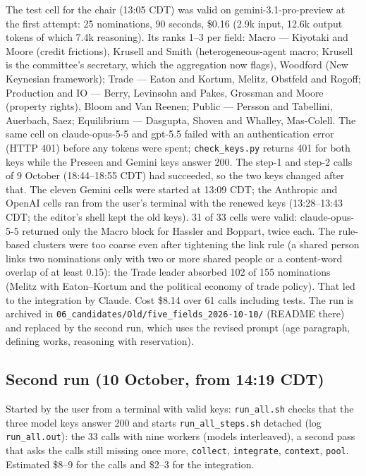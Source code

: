 \documentclass[11pt,a4paper]{article}
\newcommand{\code}[1]{\texttt{#1}}
\begin{document}
The test cell for the chair (13:05 CDT) was valid on gemini-3.1-pro-preview at the first attempt: 25 nominations,
90 seconds, \$0.16 (2.9k input, 12.6k output tokens of which 7.4k reasoning). Its ranks 1--3 per field: Macro ---
Kiyotaki and Moore (credit frictions), Krusell and Smith (heterogeneous-agent macro; Krusell is the committee's
secretary, which the aggregation now flags), Woodford (New Keynesian framework); Trade --- Eaton and Kortum, Melitz,
Obstfeld and Rogoff; Production and IO --- Berry, Levinsohn and Pakes, Grossman and Moore (property rights), Bloom and
Van Reenen; Public --- Persson and Tabellini, Auerbach, Saez; Equilibrium --- Dasgupta, Shoven and Whalley, Mas-Colell.
The same cell on claude-opus-5-5 and gpt-5.5 failed with an authentication error (HTTP 401) before any tokens were
spent; \code{check\_keys.py} returns 401 for both keys while the Preseen and Gemini keys answer 200. The step-1 and
step-2 calls of 9 October (18:44--18:55 CDT) had succeeded, so the two keys changed after that. The eleven Gemini cells
were started at 13:09 CDT; the Anthropic and OpenAI cells ran from the user's terminal with the renewed keys
(13:28--13:43 CDT; the editor's shell kept the old keys). 31 of 33 cells were valid: claude-opus-5-5 returned only the
Macro block for Hassler and Boppart, twice each. The rule-based clusters were too coarse even after tightening the link
rule (a shared person links two nominations only with two or more shared people or a content-word overlap of at least
0.15): the Trade leader absorbed 102 of 155 nominations (Melitz with Eaton--Kortum and the political economy of trade
policy). That led to the integration by Claude. Cost \$8.14 over 61 calls including tests. The run is archived in
\code{06\_candidates/Old/five\_fields\_2026-10-10/} (README there) and replaced by the second run, which uses the
revised prompt (age paragraph, defining works, reasoning with reservation).

\subsection{Second run (10 October, from 14:19 CDT)}

Started by the user from a terminal with valid keys: \code{run\_all.sh} checks that the three model keys answer 200 and
starts \code{run\_all\_steps.sh} detached (log \code{run\_all.out}): the 33 calls with nine workers (models
interleaved), a second pass that asks the calls still missing once more, \code{collect}, \code{integrate},
\code{context}, \code{pool}. Estimated \$8--9 for the calls and \$2--3 for the integration.
\end{document}
